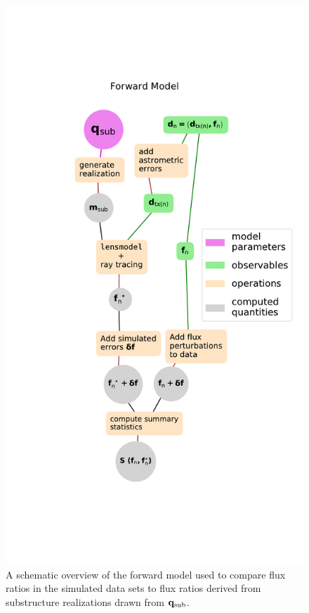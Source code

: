 \begin{figure}
	\centering
	\includegraphics[clip,trim=3.cm 5cm 1.cm
	5cm,width=.65\textwidth,keepaspectratio]{./figures_ABCforward/forward_model_graph.pdf}
	\caption[Schematic overview of the forward model]{\label{fig:visualization} A schematic overview of the forward model used to compare flux ratios in the simulated data sets to flux ratios derived from substructure realizations drawn from ${\bf{q}_{\rm{sub}}}$.}  
\end{figure}
